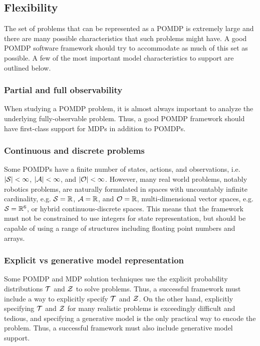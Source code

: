 \subsection{Flexibility}

The set of problems that can be represented as a POMDP is extremely large and there are many possible characteristics that such problems might have.
A good POMDP software framework should try to accommodate as much of this set as possible.
A few of the most important model characteristics to support are outlined below.

\subsubsection{Partial and full observability}

When studying a POMDP problem, it is almost always important to analyze the underlying fully-observable problem.
Thus, a good POMDP framework should have first-class support for MDPs in addition to POMDPs.

\subsubsection{Continuous and discrete problems}

Some POMDPs have a finite number of states, actions, and observations, i.e. $|\mathcal{S}| < \infty$, $|\mathcal{A}| < \infty$, and $|\mathcal{O}| < \infty$.
However, many real world problems, notably robotics problems, are naturally formulated in spaces with uncountably infinite cardinality, e.g. $\mathcal{S} = \mathbb{R}$, $\mathcal{A} = \mathbb{R}$, and $\mathcal{O} = \mathbb{R}$, multi-dimensional vector spaces, e.g. $\mathcal{S} = \mathbb{R}^6$, or hybrid continuous-discrete spaces.
This means that the framework must not be constrained to use integers for state representation, but should be capable of using a range of structures including floating point numbers and arrays.

\subsubsection{Explicit vs generative model representation}

Some POMDP and MDP solution techniques use the explicit probability distributions $\mathcal{T}$ and $\mathcal{Z}$ to solve problems.
Thus, a successful framework must include a way to explicitly specify $\mathcal{T}$ and $\mathcal{Z}$.
On the other hand, explicitly specifying $\mathcal{T}$ and $\mathcal{Z}$ for many realistic problems is exceedingly difficult and tedious, and specifying a generative model is the only practical way to encode the problem.
Thus, a successful framework must also include generative model support.

